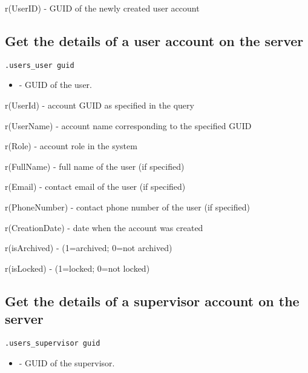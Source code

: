 \savedres
\begin{compactitem}
    \item r(UserID) - GUID of the newly created user account
\end{compactitem}

\subsection{Get the details of a user account on the server}
\begin{lstlisting}[style=CommandLineStyle]
.users_user guid
\end{lstlisting}

\paramsheader
\begin{itemize}
    \item {} - GUID of the user.
\end{itemize}

\savedres
\begin{compactitem}
    \item r(UserId) - account GUID as specified in the query
    \item r(UserName) - account name corresponding to the specified GUID
    \item r(Role) - account role in the system
    \item r(FullName) - full name of the user (if specified)
    \item r(Email) - contact email of the user (if specified)
    \item r(PhoneNumber) - contact phone number of the user (if specified)
    \item r(CreationDate) - date when the account was created
    \item r(isArchived) - (1=archived; 0=not archived)
    \item r(isLocked) - (1=locked; 0=not locked)
\end{compactitem}

\subsection{Get the details of a supervisor account on the server}
\begin{lstlisting}[style=CommandLineStyle]
.users_supervisor guid
\end{lstlisting}

\paramsheader
\begin{itemize}
\item {} - GUID of the supervisor.
\end{itemize}

